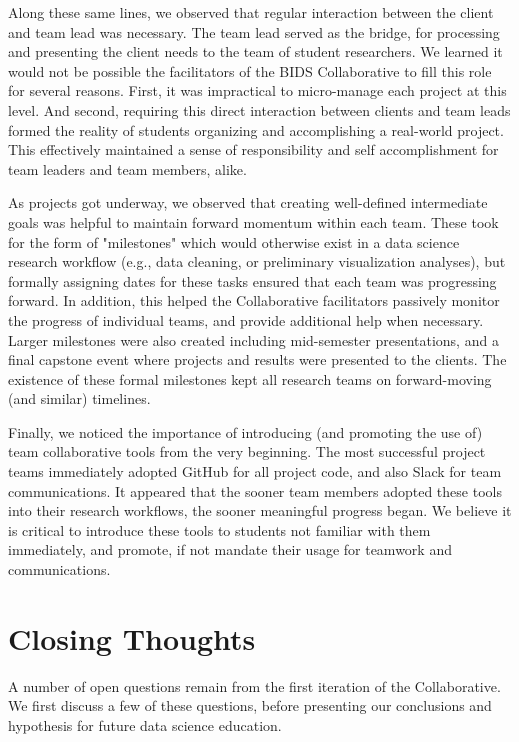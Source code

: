 \documentclass{sig-alternate}
\begin{document}
Along these same lines, we observed that regular interaction between the client and team lead was necessary. The team lead served as the bridge, for processing and presenting the client needs to the team of student researchers.  We learned it would not be possible the facilitators of the BIDS Collaborative to fill this role for several reasons.  First, it was impractical to micro-manage each project at this level.  And second, requiring this direct interaction between clients and team leads formed the reality of students organizing and accomplishing a real-world project.  This effectively maintained a sense of responsibility and self accomplishment for team leaders and team members, alike.

As projects got underway, we observed that creating well-defined intermediate goals was helpful to maintain forward momentum within each team.  These took for the form of "milestones" which would otherwise exist in a data science research workflow (e.g., data cleaning, or preliminary visualization analyses), but formally assigning dates for these tasks ensured that each team was progressing forward.  In addition, this helped the Collaborative facilitators passively monitor the progress of individual teams, and provide additional help when necessary.  Larger milestones were also created including mid-semester presentations, and a final capstone event where projects and results were presented to the clients.  The existence of these formal milestones kept all research teams on forward-moving (and similar) timelines.

Finally, we noticed the importance of introducing (and promoting the use of) team collaborative tools from the very beginning.  The most successful project teams immediately adopted GitHub for all project code, and also Slack for team communications.  It appeared that the sooner team members adopted these tools into their research workflows, the sooner meaningful progress began.  We believe it is critical to introduce these tools to students not familiar with them immediately, and promote, if not mandate their usage for teamwork and communications.


\section{Closing Thoughts}

A number of open questions remain from the first iteration of the Collaborative.  We first discuss a few of these questions, before presenting our conclusions and hypothesis for future data science education.
\end{document}
